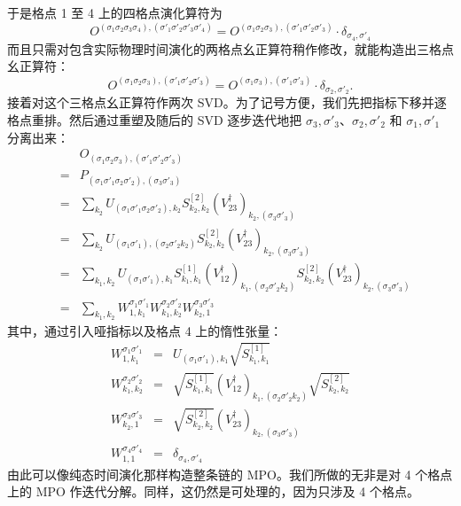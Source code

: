于是格点 1 至 4 上的四格点演化算符为
\begin{equation}
O^{(\sigma_1\sigma_2\sigma_3\sigma_4), (\sigma'_1\sigma'_2\sigma'_3\sigma'_4)} =
O^{(\sigma_1\sigma_2\sigma_3), (\sigma'_1\sigma'_2\sigma'_3)}\cdot \delta_{\sigma_4,\sigma'_4}
\end{equation}
而且只需对包含实际物理时间演化的两格点幺正算符稍作修改，就能构造出三格点幺正算符：
\begin{equation}
O^{(\sigma_1\sigma_2\sigma_3), (\sigma'_1\sigma'_2\sigma'_3)} = O^{(\sigma_1\sigma_3), (\sigma'_1\sigma'_3)} \cdot \delta_{\sigma_2,\sigma'_2} .
\end{equation}
接着对这个三格点幺正算符作两次 SVD。为了记号方便，我们先把指标下移并逐格点重排。然后通过重塑及随后的 SVD 逐步迭代地把 $\sigma_3,\sigma'_3$、$\sigma_2,\sigma'_2$ 和 $\sigma_1,\sigma'_1$ 分离出来： 
\begin{eqnarray*}
& & O_{(\sigma_1\sigma_2\sigma_3), (\sigma'_1\sigma'_2\sigma'_3)} \\
&=& P_{(\sigma_1 \sigma'_1\sigma_2\sigma'_2),(\sigma_3\sigma'_3)} \\
&=& \sum_{k_2} U_{(\sigma_1 \sigma'_1\sigma_2\sigma'_2),k_2} S^{[2]}_{k_2,k_2} (V^\dagger_{23})_{k_2,(\sigma_3\sigma'_3)} \\
&=&  \sum_{k_2} U_{(\sigma_1 \sigma'_1),(\sigma_2\sigma'_2 k_2)} S^{[2]}_{k_2,k_2} (V^\dagger_{23})_{k_2,(\sigma_3\sigma'_3)} \\
&=& \sum_{k_1,k_2} U_{(\sigma_1 \sigma'_1),k_1} S^{[1]}_{k_1,k_1} (V^\dagger_{12})_{k_1, (\sigma_2\sigma'_2 k_2)} S^{[2]}_{k_2,k_2} (V^\dagger_{23})_{k_2,(\sigma_3\sigma'_3)} \\
&=& \sum_{k_1,k_2} W^{\sigma_1 \sigma'_1}_{1,k_1} W^{\sigma_2 \sigma'_2}_{k_1,k_2} W^{\sigma_3 \sigma'_3}_{k_2,1} 
\end{eqnarray*}
其中，通过引入哑指标以及格点 4 上的惰性张量：
\begin{eqnarray}
W^{\sigma_1 \sigma'_1}_{1,k_1} &=& U_{(\sigma_1 \sigma'_1),k_1} \sqrt{S^{[1]}_{k_1,k_1}} \\
W^{\sigma_2 \sigma'_2}_{k_1,k_2} &=& \sqrt{S^{[1]}_{k_1,k_1}} (V^\dagger_{12})_{k_1, (\sigma_2\sigma'_2 k_2)} \sqrt{S^{[2]}_{k_2,k_2}} \\
W^{\sigma_3 \sigma'_3}_{k_2,1} &=& \sqrt{S^{[2]}_{k_2,k_2}} (V^\dagger_{23})_{k_2,(\sigma_3\sigma'_3)} \\
W^{\sigma_4 \sigma'_4}_{1,1} &=& \delta_{\sigma_4,\sigma'_4}
\end{eqnarray}
由此可以像纯态时间演化那样构造整条链的 MPO。我们所做的无非是对 4 个格点上的 MPO 作迭代分解。同样，这仍然是可处理的，因为只涉及 4 个格点。 

